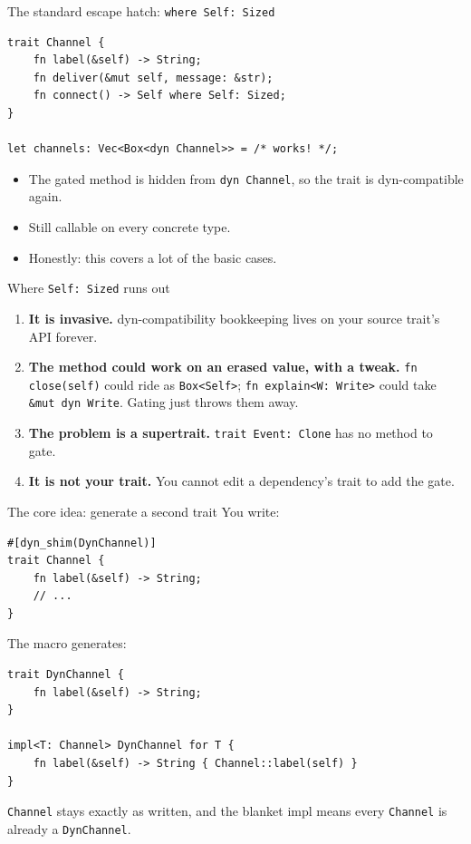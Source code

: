 \documentclass[aspectratio=169]{beamer}
\begin{document}
\begin{frame}[fragile]{The standard escape hatch: \texttt{where Self: Sized}}
\begin{lstlisting}
trait Channel {
    fn label(&self) -> String;
    fn deliver(&mut self, message: &str);
    fn connect() -> Self where Self: Sized;
}

let channels: Vec<Box<dyn Channel>> = /* works! */;
\end{lstlisting}
  \begin{itemize}
    \item The gated method is hidden from \texttt{dyn Channel}, so the trait is
          dyn-compatible again.
    \item Still callable on every concrete type.
    \item Honestly: this covers a lot of the basic cases.
  \end{itemize}
\end{frame}

\begin{frame}{Where \texttt{Self: Sized} runs out}
  \begin{enumerate}
    \item<1-> \textbf{It is invasive.} dyn-compatibility bookkeeping lives on
          your source trait's API forever.
    \item<2-> \textbf{The method could work on an erased value, with a tweak.}
          \texttt{fn close(self)} could ride as \texttt{Box<Self>};
          \texttt{fn explain<W: Write>} could take \texttt{\&mut dyn Write}.
          Gating just throws them away.
    \item<3-> \textbf{The problem is a supertrait.}
          \texttt{trait Event: Clone} has no method to gate.
    \item<4-> \textbf{It is not your trait.} You cannot edit a dependency's
          trait to add the gate.
  \end{enumerate}
\end{frame}


\begin{frame}[fragile]{The core idea: generate a second trait}
  You write:
\begin{lstlisting}
#[dyn_shim(DynChannel)]
trait Channel {
    fn label(&self) -> String;
    // ...
}
\end{lstlisting}
\pause
  The macro generates:
\begin{lstlisting}
trait DynChannel {
    fn label(&self) -> String;
}

impl<T: Channel> DynChannel for T {
    fn label(&self) -> String { Channel::label(self) }
}
\end{lstlisting}
  \texttt{Channel} stays exactly as written, and the blanket impl means every
  \texttt{Channel} is already a \texttt{DynChannel}.
\end{frame}
\end{document}
